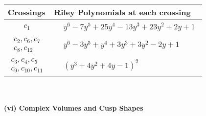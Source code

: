 \documentclass[1p]{elsarticle_modified}
\theoremstyle{definition}
\begin{document}
\begin{tabular}{m{50pt}|m{274pt}}
Crossings & \hspace{64pt}Riley Polynomials at each crossing \\
\hline $$\begin{aligned}c_{1}\end{aligned}$$&$\begin{aligned}
&y^6-7 y^5+25 y^4-13 y^3+23 y^2+2 y+1
\end{aligned}$\\
\hline $$\begin{aligned}c_{2},c_{6},c_{7}\\c_{8},c_{12}\end{aligned}$$&$\begin{aligned}
&y^6-3 y^5+y^4+3 y^3+3 y^2-2 y+1
\end{aligned}$\\
\hline $$\begin{aligned}c_{3},c_{4},c_{5}\\c_{9},c_{10},c_{11}\end{aligned}$$&$\begin{aligned}
&(y^3+4 y^2+4 y-1)^2
\end{aligned}$\\
\hline
\end{tabular}\\~\\
\newpage\flushleft \textbf{(vi) Complex Volumes and Cusp Shapes}
\end{document}
